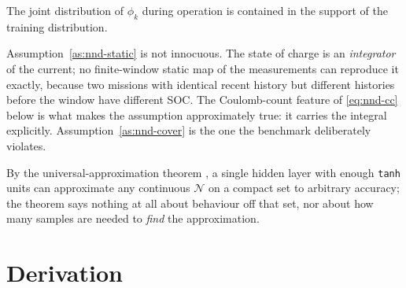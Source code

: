 \begin{assumption}[Coverage]\label{as:nnd-cover}
The joint distribution of $\phi_k$ during operation is contained in the support of the training
distribution.
\end{assumption}

Assumption~\ref{as:nnd-static} is not innocuous.  The state of charge is an \emph{integrator} of
the current; no finite-window static map of the measurements can reproduce it exactly, because two
missions with identical recent history but different histories before the window have different
SOC.  The Coulomb-count feature of \cref{eq:nnd-cc} below is what makes the assumption
approximately true: it carries the integral explicitly.  Assumption~\ref{as:nnd-cover} is the one
the benchmark deliberately violates.

By the universal-approximation theorem \citep{hornik1989}, a single hidden layer with enough
\texttt{tanh} units can approximate any continuous $\mathcal{N}$ on a compact set to arbitrary
accuracy; the theorem says nothing at all about behaviour off that set, nor about how many samples
are needed to \emph{find} the approximation.

\section{Derivation}

